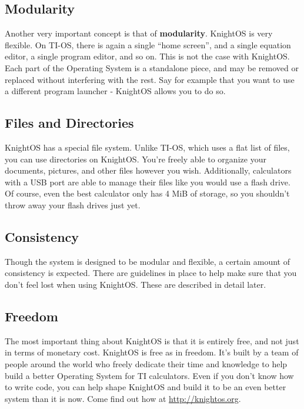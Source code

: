 \subsection{Modularity}

Another very important concept is that of \textbf{modularity}. KnightOS is very
flexible. On TI-OS, there is again a single ``home screen'', and a single equation
editor, a single program editor, and so on. This is not the case with KnightOS.
Each part of the Operating System is a standalone piece, and may be removed or
replaced without interfering with the rest. Say for example that you want to use a
different program launcher - KnightOS allows you to do so.

\subsection{Files and Directories}

KnightOS has a special file system. Unlike TI-OS, which uses a flat list of files,
you can use directories on KnightOS. You're freely able to organize your
documents, pictures, and other files however you wish. Additionally, calculators
with a USB port are able to manage their files like you would use a flash drive.
Of course, even the best calculator only has 4 MiB of storage, so you shouldn't
throw away your flash drives just yet.

\subsection{Consistency}

Though the system is designed to be modular and flexible, a certain amount of
consistency is expected. There are guidelines in place to help make sure that you
don't feel lost when using KnightOS. These are described in detail later.

\subsection{Freedom}

The most important thing about KnightOS is that it is entirely free, and not just
in terms of monetary cost. KnightOS is free as in freedom. It's built by a team of
people around the world who freely dedicate their time and knowledge to help build
a better Operating System for TI calculators. Even if you don't know how to write
code, you can help shape KnightOS and build it to be an even better system than it
is now. Come find out how at \url{http://knightos.org}.
